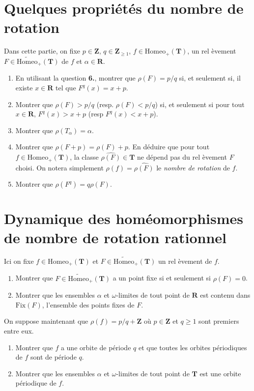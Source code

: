 \documentclass[a4paper,12pt]{article}
\theoremstyle{plain}
\theoremstyle{definition}
\newcommand{\T}{\mathbf{T}}
\newcommand{\R}{\mathbf{R}}
\newcommand{\Z}{\mathbf{Z}}
\newcommand{\Homeo}{\mathrm{Homeo}}
\begin{document}
{\section*{Quelques propri\'et\'es du nombre de rotation}
Dans cette partie, on fixe $p \in \Z$, $q \in \Z_{\geq 1}$, $f \in \Homeo_+(\T)$, un rel \`evement $F \in \widetilde{\Homeo}_+(\T)$ de $f$ et $\alpha \in \R$. \\
\begin{enumerate}[resume, label=\textbf{\arabic*.}]
\item En utilisant la question \textbf{6.}, montrer que $\rho(F) = p/q$ si, et seulement si, il existe $x \in \R$ tel que $F^q(x) = x + p$. 
\item Montrer que $\rho(F) > p/q$ (resp. $ \rho(F) < p/q$) si, et seulement si pour tout $x\in \R$, $F^q(x) > x +p$ (resp $F^q(x) < x + p$). 
\item Montrer que $\rho(T_\alpha) = \alpha.$ 
\item Montrer que $\rho(F + p) = \rho(F) + p.$ En d\'eduire que pour tout $f \in \Homeo_+(\T)$, la classe $\widehat{\rho(F)} \in \T$ ne d\'epend pas du rel \`evement $F$ choisi. On notera simplement $\rho(f) = \widehat{\rho(F)}$ le \emph{nombre de rotation} de $f$.
\item Montrer que $\rho(F^q) = q\rho(F)$.
\end{enumerate}
\section*{Dynamique des hom\'eomorphismes de nombre de rotation rationnel}
Ici on fixe $f \in \Homeo_+(\T)$ et $F \in \widetilde{\Homeo}_+(\T)$ un rel \`evement de $f$. 
\begin{enumerate}[resume, label=\textbf{\arabic*.}]
\item Montrer que $F \in \widetilde{\Homeo}_+(\T)$ a un point fixe si et seulement si $\rho(F) = 0$. 
\item Montrer que les ensembles $\alpha$ et $\omega$-limites de tout point de $\R$ est contenu dans $\mathrm{Fix}(F)$, l'ensemble des points fixes de $F$.
\end{enumerate}
On suppose maintenant que $\rho(f) = p/q + \Z$ o\`u $p \in \Z$ et $q \geq 1$ sont premiers entre eux. 
\begin{enumerate}[resume, label=\textbf{\arabic*.}]
\item  Montrer que $f$ a une orbite de p\'eriode $q$ et que toutes les orbites p\'eriodiques de $f$ sont de p\'eriode $q$. 
\item  Montrer que les ensembles $\alpha$ et $\omega$-limites de tout point de $\T$ est une orbite p\'eriodique de $f$.
\end{enumerate}

}
\end{document}
